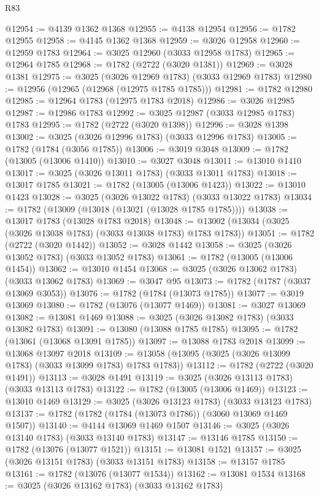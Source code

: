 \begin{lexlean}{R83}
\begin{coremodule}
@12954 := @4139 @1362 @1368
@12955 := @4138 @12954
@12956 := @1782 @12955
@12958 := @4145 @1362 @1368
@12959 := @3026 @12958
@12960 := @12959 @1783
@12964 := @3025 @12960 (@3033 @12958 @1783)
@12965 := @12964 @1785
@12968 := @1782 (@2722 (@3020 @1381))
@12969 := @3028 @1381
@12975 := @3025 (@3026 @12969 @1783) (@3033 @12969 @1783)
@12980 := @12956 (@12965 (@12968 (@12975 @1785 @1785)))
@12981 := @1782 @12980
@12985 := @12964 @1783 (@12975 @1783 @2018)
@12986 := @3026 @12985
@12987 := @12986 @1783
@12992 := @3025 @12987 (@3033 @12985 @1783) @1783
@12995 := @1782 (@2722 (@3020 @1398))
@12996 := @3028 @1398
@13002 := @3025 (@3026 @12996 @1783) (@3033 @12996 @1783)
@13005 := @1782 (@1784 (@3056 @1785))
@13006 := @3019 @3048
@13009 := @1782 (@13005 (@13006 @1410))
@13010 := @3027 @3048
@13011 := @13010 @1410
@13017 := @3025 (@3026 @13011 @1783) (@3033 @13011 @1783)
@13018 := @13017 @1785
@13021 := @1782 (@13005 (@13006 @1423))
@13022 := @13010 @1423
@13028 := @3025 (@3026 @13022 @1783) (@3033 @13022 @1783)
@13034 := @1782 (@13009 (@13018 (@13021 (@13028 @1785 @1785))))
@13038 := @13017 @1783 (@13028 @1783 @2018)
@13048 := @13002 (@13034 (@3025 (@3026 @13038 @1783) (@3033 @13038 @1783) @1783 @1783))
@13051 := @1782 (@2722 (@3020 @1442))
@13052 := @3028 @1442
@13058 := @3025 (@3026 @13052 @1783) (@3033 @13052 @1783)
@13061 := @1782 (@13005 (@13006 @1454))
@13062 := @13010 @1454
@13068 := @3025 (@3026 @13062 @1783) (@3033 @13062 @1783)
@13069 := @3047 @95
@13073 := @1782 (@1787 (@3037 @13069 @3053))
@13076 := @1782 (@1784 (@13073 @1785))
@13077 := @3019 @13069
@13080 := @1782 (@13076 (@13077 @1469))
@13081 := @3027 @13069
@13082 := @13081 @1469
@13088 := @3025 (@3026 @13082 @1783) (@3033 @13082 @1783)
@13091 := @13080 (@13088 @1785 @1785)
@13095 := @1782 (@13061 (@13068 @13091 @1785))
@13097 := @13088 @1783 @2018
@13099 := @13068 @13097 @2018
@13109 := @13058 (@13095 (@3025 (@3026 @13099 @1783) (@3033 @13099 @1783) @1783 @1783))
@13112 := @1782 (@2722 (@3020 @1491))
@13113 := @3028 @1491
@13119 := @3025 (@3026 @13113 @1783) (@3033 @13113 @1783)
@13122 := @1782 (@13005 (@13006 @1469))
@13123 := @13010 @1469
@13129 := @3025 (@3026 @13123 @1783) (@3033 @13123 @1783)
@13137 := @1782 (@1782 (@1784 (@13073 @1786)) (@3060 @13069 @1469 @1507))
@13140 := @4144 @13069 @1469 @1507
@13146 := @3025 (@3026 @13140 @1783) (@3033 @13140 @1783)
@13147 := @13146 @1785
@13150 := @1782 (@13076 (@13077 @1521))
@13151 := @13081 @1521
@13157 := @3025 (@3026 @13151 @1783) (@3033 @13151 @1783)
@13158 := @13157 @1785
@13161 := @1782 (@13076 (@13077 @1534))
@13162 := @13081 @1534
@13168 := @3025 (@3026 @13162 @1783) (@3033 @13162 @1783)

\end{coremodule}
\end{lexlean}

